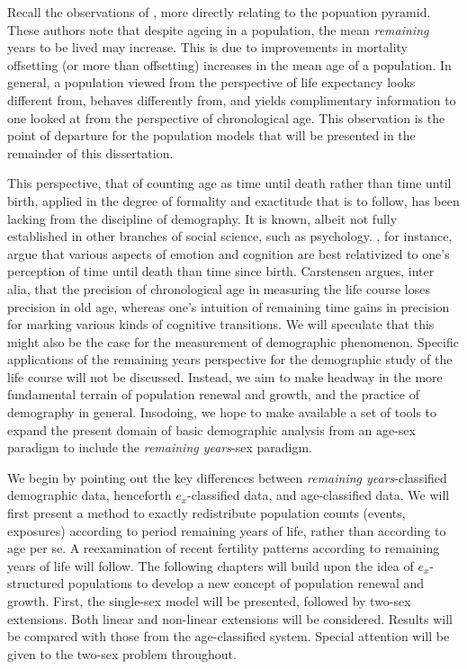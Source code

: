  \FloatBarrier
Recall the observations of \citet{sanderson2005average}, more directly
relating to the popuation pyramid. These authors note that despite ageing in a
population, the mean \textit{remaining} years to be lived may increase. This is due 
to improvements in mortality offsetting (or more than offsetting) increases in
the mean age of a population. In general, a population viewed from the
perspective of life expectancy looks different from, behaves differently from,
and yields complimentary information to one looked at from the
perspective of chronological age. This observation is the point of departure for
the population models that will be presented in the remainder of this
dissertation.

This perspective, that of counting age as time until death rather than time
until birth, applied in the degree of formality and exactitude that is to
follow, has been lacking from the discipline of demography. It is known, albeit 
not fully established in other branches of social science, such as psychology.
\citet{carstensen2006influence,carstensen1999taking}, for instance, argue that
various aspects of emotion and cognition are best relativized to one's perception of time until
death than time since birth. Carstensen argues, inter alia, that the precision
of chronological age in measuring the life course loses precision in old age,
whereas one's intuition of remaining time gains in precision for marking various
kinds of cognitive transitions. We will speculate that this might also be
the case for the measurement of demographic phenomenon. Specific applications of
the remaining years perspective for the demographic study of the life course
will not be discussed. Instead, we aim to make headway in the more fundamental terrain of
population renewal and growth, and the practice of demography in general.
Insodoing, we hope to make available a set of tools to expand the present domain
of basic demographic analysis from an age-sex paradigm to include the
\textit{remaining years}-sex paradigm.

We begin by pointing out the key differences
between \textit{remaining years}-classified demographic data,
henceforth $e_x$-classified data, and age-classified data. We will first present
a method to exactly redistribute population counts (events, exposures) according to
period remaining years of life, rather than according to age per se. A reexamination 
of recent fertility patterns according to remaining years of life will follow.
The following chapters will build upon the idea of $e_x$-structured populations
to develop a new concept of population renewal and growth. First, the single-sex
model will be presented, followed by two-sex extensions. Both linear and
non-linear extensions will be considered. Results will be compared with those
from the age-classified system. Special attention will be given to the two-sex
problem throughout.


